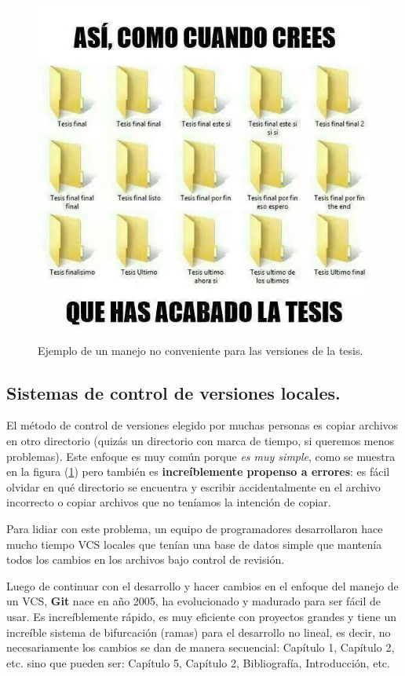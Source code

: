 \begin{figure}[H]
    \centering
    \includegraphics[scale=0.45]{Imagenes/meme_tesis.jpeg}
    \caption{Ejemplo de un manejo no conveniente para las versiones de la tesis.}
    \label{fig:figura_tesis}
\end{figure}

\subsection{Sistemas de control de versiones locales.}

El método de control de versiones elegido por muchas personas es copiar archivos en otro directorio (quizás un directorio con marca de tiempo, si queremos menos problemas). Este enfoque es muy común porque \textit{es muy simple}, como se muestra en la figura (\ref{fig:figura_tesis}) pero también es \textbf{increíblemente propenso a errores}: es fácil olvidar en qué directorio se encuentra y escribir accidentalmente en el archivo incorrecto o copiar archivos que no teníamos la intención de copiar.
\par
Para lidiar con este problema, un equipo de programadores desarrollaron hace mucho tiempo VCS locales que tenían una base de datos simple que mantenía todos los cambios en los archivos bajo control de revisión.
\par
Luego de continuar con el desarrollo y hacer cambios en el enfoque del manejo de un VCS, \textbf{Git} nace en año 2005, ha evolucionado y madurado para ser fácil de usar. Es increíblemente rápido, es muy eficiente con proyectos grandes y tiene un increíble sistema de bifurcación (ramas) para el desarrollo no lineal, es decir, no necesariamente los cambios se dan de manera secuencial: Capítulo 1, Capítulo 2, etc. sino que pueden ser: Capítulo 5, Capítulo 2, Bibliografía, Introducción, etc.

